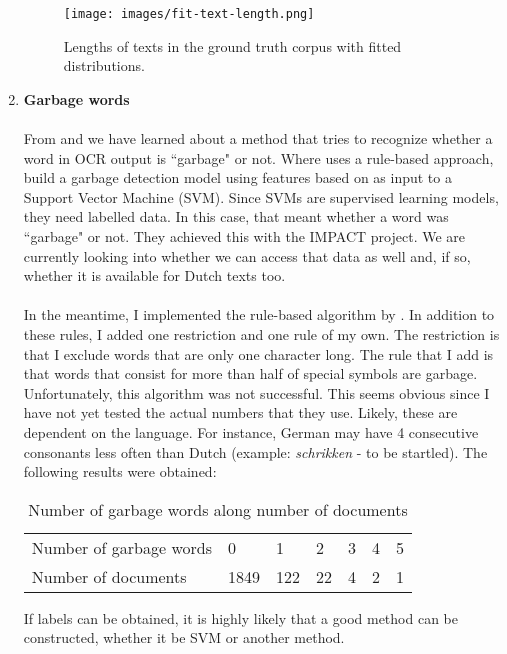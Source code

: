 \documentclass{article}
\begin{document}
\begin{enumerate}
		\begin{figure}[H]
			\centering
			\texttt{[image: images/fit-text-length.png]}
			\caption{Lengths of texts in the ground truth corpus with fitted distributions.}
			\label{fig:fit-text-length}
		\end{figure}
	
		\item \textbf{Garbage words}
		\\ \\
		From \cite{kulp2007retrieving} and \cite{wudtke2011recognizing} we have learned about a method that tries to recognize whether a word in OCR output is ``garbage" or not. Where \cite{kulp2007retrieving} uses a rule-based approach, \cite{wudtke2011recognizing} build a garbage detection model using features based on \cite{kulp2007retrieving} as input to a Support Vector Machine (SVM). Since SVMs are supervised learning models, they need labelled data. In this case, that meant whether a word was ``garbage" or not. They achieved this with the IMPACT project. We are currently looking into whether we can access that data as well and, if so, whether it is available for Dutch texts too.
		\\ \\
		In the meantime, I implemented the rule-based algorithm by \cite{kulp2007retrieving}. In addition to these rules, I added one restriction and one rule of my own. The restriction is that I exclude words that are only one character long. The rule that I add is that words that consist for more than half of special symbols are garbage. Unfortunately, this algorithm was not successful. This seems obvious since I have not yet tested the actual numbers that they use. Likely, these are dependent on the language. For instance, German may have 4 consecutive consonants less often than Dutch (example: \textit{schrikken} - to be startled). The following results were obtained:
		
		\begin{table}[H]
			\centering
			\begin{tabular}{lllllll} \toprule
				Number of garbage words & 0    & 1   & 2  & 3 & 4 & 5 \\
				Number of documents     & 1849 & 122 & 22 & 4 & 2 & 1 \\ \bottomrule
			\end{tabular}
			\caption{Number of garbage words along number of documents}
			\label{tab:value_counts_garbage}
		\end{table}
	
		If labels can be obtained, it is highly likely that a good method can be constructed, whether it be SVM or another method.
		
	\end{enumerate}
\end{document}

